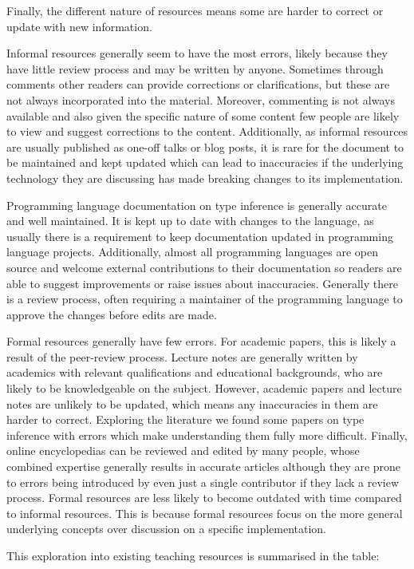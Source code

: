 \documentclass[a4paper,fleqn,oneside,12pt]{report}
\begin{document}
Finally, the different nature of resources means some are harder to correct or update with new information.

Informal resources generally seem to have the most errors, likely because they have little review process and may be written by anyone. Sometimes through comments other readers can provide corrections or clarifications, but these are not always incorporated into the material. Moreover, commenting is not always available and also given the specific nature of some content few people are likely to view and suggest corrections to the content. Additionally, as informal resources are usually published as one-off talks or blog posts, it is rare for the document to be maintained and kept updated which can lead to inaccuracies if the underlying technology they are discussing has made breaking changes to its implementation.

Programming language documentation on type inference is generally accurate and well maintained. It is kept up to date with changes to the language, as usually there is a requirement to keep documentation updated in programming language projects. Additionally, almost all programming languages are open source and welcome external contributions to their documentation so readers are able to suggest improvements or raise issues about inaccuracies. Generally there is a review process, often requiring a maintainer of the programming language to approve the changes before edits are made.

Formal resources generally have few errors. For academic papers, this is likely a result of the peer-review process. Lecture notes are generally written by academics with relevant qualifications and educational backgrounds, who are likely to be knowledgeable on the subject. However, academic papers and lecture notes are unlikely to be updated, which means any inaccuracies in them are harder to correct. Exploring the literature we found some papers on type inference with errors which make understanding them fully more difficult. Finally, online encyclopedias can be reviewed and edited by many people, whose combined expertise generally results in accurate articles although they are prone to errors being introduced by even just a single contributor if they lack a review process. Formal resources are less likely to become outdated with time compared to informal resources. This is because formal resources focus on the more general underlying concepts over discussion on a specific implementation.

This exploration into existing teaching resources is summarised in the table:
\end{document}
